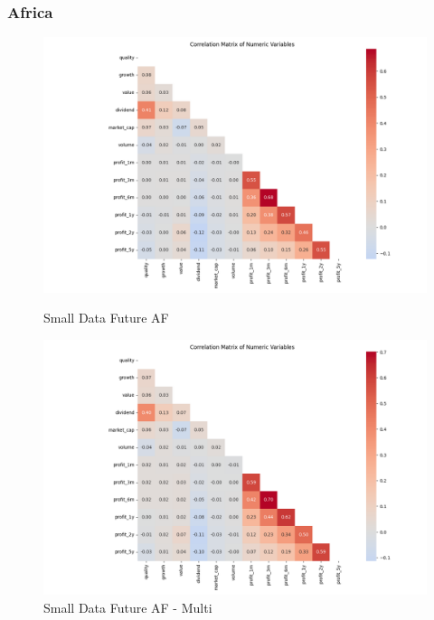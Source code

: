 \documentclass[11pt,english,a4paper,hidelinks]{book}
\begin{document}
\subsubsection{Africa}
\begin{figure}[H]
    \centering
    \begin{minipage}{0.48\textwidth}
        \centering
        \includegraphics[width=\linewidth]{images/code/descriptive analysis/correlations/Small Data future AF.png}
        \caption{Small Data Future AF}
        \label{fig:small_data_future_af_correlations}
    \end{minipage}
    \begin{minipage}{0.48\textwidth}
        \centering
        \includegraphics[width=\linewidth]{images/code/descriptive analysis/correlations/Small Data future AF - Multi.png}
        \caption{Small Data Future AF - Multi}
        \label{fig:small_data_future_af_multi_correlations}
    \end{minipage}
\end{figure}
\end{document}
